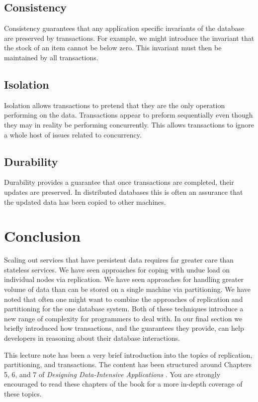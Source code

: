 \subsection{Consistency}
Consistency guarantees that any application specific invariants of the database are preserved by transactions.
For example, we might introduce the invariant that the stock of an item cannot be below zero.
This invariant must then be maintained by all transactions.

\subsection{Isolation}
Isolation allows transactions to pretend that they are the only operation performing on the data.
Transactions appear to preform sequentially even though they may in reality be performing concurrently.
This allows transactions to ignore a whole host of issues related to concurrency.

\subsection{Durability}
Durability provides a guarantee that once transactions are completed,
their updates are preserved.
In distributed databases this is often an assurance that the updated data has been copied to other machines.

\section{Conclusion}

Scaling out services that have persistent data requires far greater care than stateless services.
We have seen approaches for coping with undue load on individual nodes via replication.
We have seen approaches for handling greater volume of data than can be stored on a single machine via partitioning.
We have noted that often one might want to combine the approaches of replication and partitioning for the one database system.
Both of these techniques introduce a new range of complexity for programmers to deal with.
In our final section we briefly introduced how transactions, and the guarantees they provide, can help developers in reasoning about their database interactions.

This lecture note has been a very brief introduction into the topics of replication, partitioning, and transactions.
The content has been structured around Chapters 5, 6, and 7 of \textit{Designing Data-Intensive Applications} \cite{data-intensive}.
You are strongly encouraged to read these chapters of the book for a more in-depth coverage of these topics.
